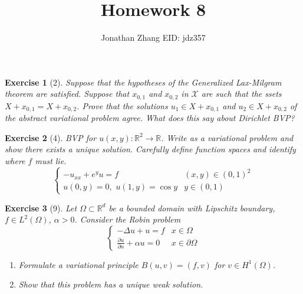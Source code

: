 \documentclass[letterpaper,twoside,11pt]{article}
\theoremstyle{mystyle}
\newtheorem*{exercise}{Exercise}
\newcommand{\R}{{\mathbb R}}
\begin{document}
\title{\vspace{-2\baselineskip} 
Homework 8
}
\author{Jonathan Zhang \qquad EID: { jdz357} }
\date{}
\maketitle

\begin{exercise}[2]
  Suppose that the hypotheses of the Generalized Lax-Milgram theorem are satisfied. Suppose that $x_{0,1}$ and $x_{0,2}$ in $\mathcal X$ are such that the ssets $X + x_{0,1} = X + x_{0,2}$. Prove that the solutions $u_1 \in X + x_{0,1}$ and $u_2 \in X + x_{0,2}$ of the abstract variational problem agree. What does this say about Dirichlet BVP? 
\end{exercise}


\begin{exercise}[4]
BVP for $u (x,y) : \R^2 \to \R$. Write as a variational problem and show there exists a unique solution. Carefully define function spaces and identify where $f$ must lie. 
\[\left\{ {\begin{array}{*{20}{c}}
  { - {u_{xx}} + {e^y}u = f}&{\left( {x,y} \right) \in {{\left( {0,1} \right)}^2}} \\[.2cm] 
  {u\left( {0,y} \right) = 0,\,\,u\left( {1,y} \right) = \cos y}&{y \in \left( {0,1} \right)} 
\end{array}} \right.\]
\end{exercise}


\begin{exercise}[9]
Let $\Omega\subset \R^d$ be a bounded domain with Lipschitz boundary, $f \in L^2 \left( \Omega \right)$, $\alpha > 0$. Consider the Robin problem
\[\left\{ {\begin{array}{*{20}{c}}
  { -\Delta u + u = f}&{x\in \Omega} \\[.2cm] 
  {\displaystyle \frac{\partial u}{\partial n }+ \alpha u = 0}&{x \in \partial \Omega} 
\end{array}} \right.\]
\begin{enumerate}
  \item Formulate a variational principle $B(u,v) = (f, v)$ for $v \in H^1 \left( \Omega \right)$. 
  \item Show that this problem has a unique weak solution. 
\end{enumerate}
\end{exercise}
\end{document}
